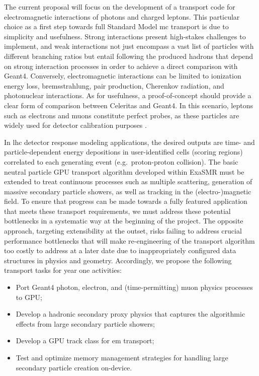 \documentclass[10pt]{article}
\begin{document}
The current proposal will focus on the development of a transport code
for electromagnetic interactions of photons and charged leptons. This particular
choice as a first step towards full Standard Model \ac{mc} transport is due
to simplicity and usefulness. Strong interactions present high-stakes
challenges to implement, and weak interactions not just encompass a vast
list of particles with different branching ratios but entail following
the produced hadrons that depend on strong interaction processes in
order to achieve a direct comparison with Geant4. Conversely,
electromagnetic interactions can be limited to ionization energy loss,
bremsstrahlung, pair production, Cherenkov radiation, and photonuclear
interactions. As for usefulness, a proof-of-concept should provide a
clear form of comparison between Celeritas and Geant4. In this scenario,
leptons such as electrons and muons constitute perfect probes, as these
particles are widely used for detector calibration purposes 
\cite{atlas_calibration_e,atlas_calibration_mu}.

In \ac{lhc} detector response modeling applications, the desired outputs are
time- and particle-dependent energy depositions in user-identified cells
(scoring regions) correlated to each generating event
(e.g.~proton-proton collision). The basic neutral particle GPU transport
algorithm developed within ExaSMR must be extended to treat
continuous processes such as multiple scattering, generation of massive secondary
particle showers, as well as tracking in the (electro-)magnetic field. To ensure that progress can be made towards a fully featured application that meets these transport
requirements, we must address these potential bottlenecks in a
systematic way at the beginning of the project. The opposite approach, targeting extensibility at the outset, risks failing to
address crucial performance bottlenecks that will make
re-engineering of the transport algorithm too costly to address at a
later date due to inappropriately configured data structures in physics
and geometry. Accordingly, we propose the following transport tasks for
year one activities:
\begin{itemize}
 \itemsep2pt%
 \parskip0pt%
\item
  Port Geant4 photon, electron, and (time-permitting) muon physics processes to
  GPU;
\item
  Develop a hadronic secondary proxy physics that captures the
  algorithmic effects from large secondary particle showers;
\item
  Develop a GPU track class for \ac{em} transport;
\item
  Test and optimize memory management strategies for handling large
  secondary particle creation on-device.
\end{itemize}
\end{document}
